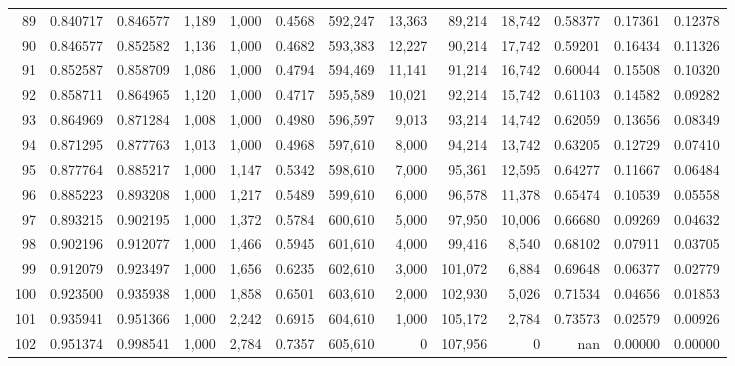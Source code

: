 \begin{tabular}{rrrrrrrrrrrrr}
89  &  0.840717 &  0.846577 &   1,189 &  1,000 &                                     0.4568 &  592,247 &   13,363 &   89,214 &   18,742 &  0.58377 &  0.17361 &  0.12378 \\
90  &  0.846577 &  0.852582 &   1,136 &  1,000 &                                     0.4682 &  593,383 &   12,227 &   90,214 &   17,742 &  0.59201 &  0.16434 &  0.11326 \\
91  &  0.852587 &  0.858709 &   1,086 &  1,000 &                                     0.4794 &  594,469 &   11,141 &   91,214 &   16,742 &  0.60044 &  0.15508 &  0.10320 \\
92  &  0.858711 &  0.864965 &   1,120 &  1,000 &                                     0.4717 &  595,589 &   10,021 &   92,214 &   15,742 &  0.61103 &  0.14582 &  0.09282 \\
93  &  0.864969 &  0.871284 &   1,008 &  1,000 &                                     0.4980 &  596,597 &    9,013 &   93,214 &   14,742 &  0.62059 &  0.13656 &  0.08349 \\
94  &  0.871295 &  0.877763 &   1,013 &  1,000 &                                     0.4968 &  597,610 &    8,000 &   94,214 &   13,742 &  0.63205 &  0.12729 &  0.07410 \\
95  &  0.877764 &  0.885217 &   1,000 &  1,147 &                                     0.5342 &  598,610 &    7,000 &   95,361 &   12,595 &  0.64277 &  0.11667 &  0.06484 \\
96  &  0.885223 &  0.893208 &   1,000 &  1,217 &                                     0.5489 &  599,610 &    6,000 &   96,578 &   11,378 &  0.65474 &  0.10539 &  0.05558 \\
97  &  0.893215 &  0.902195 &   1,000 &  1,372 &                                     0.5784 &  600,610 &    5,000 &   97,950 &   10,006 &  0.66680 &  0.09269 &  0.04632 \\
98  &  0.902196 &  0.912077 &   1,000 &  1,466 &                                     0.5945 &  601,610 &    4,000 &   99,416 &    8,540 &  0.68102 &  0.07911 &  0.03705 \\
99  &  0.912079 &  0.923497 &   1,000 &  1,656 &                                     0.6235 &  602,610 &    3,000 &  101,072 &    6,884 &  0.69648 &  0.06377 &  0.02779 \\
100 &  0.923500 &  0.935938 &   1,000 &  1,858 &                                     0.6501 &  603,610 &    2,000 &  102,930 &    5,026 &  0.71534 &  0.04656 &  0.01853 \\
101 &  0.935941 &  0.951366 &   1,000 &  2,242 &                                     0.6915 &  604,610 &    1,000 &  105,172 &    2,784 &  0.73573 &  0.02579 &  0.00926 \\
102 &  0.951374 &  0.998541 &   1,000 &  2,784 &                                     0.7357 &  605,610 &        0 &  107,956 &        0 &      nan &  0.00000 &  0.00000 \\
\bottomrule
\end{tabular}

